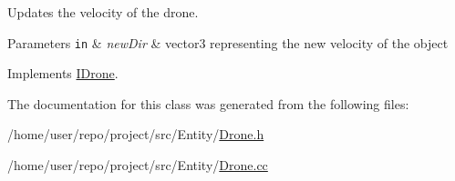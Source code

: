 Updates the velocity of the drone. 


\begin{DoxyParams}[1]{Parameters}
\mbox{\tt in}  & {\em new\+Dir} & vector3 representing the new velocity of the object \\
\hline
\end{DoxyParams}


Implements \hyperlink{classIDrone_a5cc88b8205adaeea8f71c822d08e1607}{I\+Drone}.



The documentation for this class was generated from the following files\+:\begin{DoxyCompactItemize}
\item 
/home/user/repo/project/src/\+Entity/\hyperlink{Drone_8h}{Drone.\+h}\item 
/home/user/repo/project/src/\+Entity/\hyperlink{Drone_8cc}{Drone.\+cc}\end{DoxyCompactItemize}
